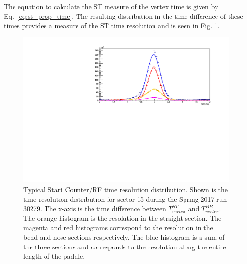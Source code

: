 The equation to calculate the ST measure of the vertex time is given by Eq.~\ref{eq:st_prop_time}.  
The resulting distribution in the time difference of these times provides a measure of the ST time resolution and is seen in Fig. \ref{fig:beam_tof_corr_chan_15}.
	\begin{figure}[!htb]
		\centering
		\includegraphics[width=1.1\linewidth]{performance/figs/NIM_TR_ALL_sector15}
		\caption[Typical Start Counter/RF time resolution distribution]{Typical Start Counter/RF time resolution distribution.  Shown is the time resolution distribution for sector 15 during the Spring 2017 run 30279. The x-axis is the time difference between $T^{ST}_{vertex}$ and $T^{BB}_{vertex}$. The orange histogram is the resolution in the straight section. The magenta and red histograms correspond to the resolution in the bend and nose sections respectively. The blue histogram is a sum of the three sections and corresponds to the resolution along the entire length of the paddle.}
		\label{fig:beam_tof_corr_chan_15}
	\end{figure}
	

